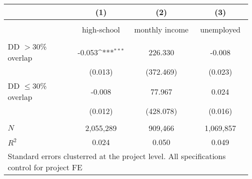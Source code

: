 {
\def\sym#1{\ifmmode^{#1}\else\(^{#1}\)\fi}
\begin{tabular}{l*{3}{c}}
 & (1) & (2) & (3)  \\[0.2em]
\hline\\[-0.9em]

                           &   high-school    &   monthly income     &   unemployed  \\
[0.2em]\hline \\[-0.9em]

DD $>$30\% overlap         &  -0.053\sym{***}  &  226.330         &   -0.008         \\
                           &  (0.013)          &(372.469)         &  (0.023)         \\
[0.5em]
DD $\leq$30\% overlap      &   -0.008         &   77.967         &    0.024         \\
                           &  (0.012)         &(428.078)         &  (0.016)         \\
\hline \\[-0.9em]    
\(N\)                      &  2,055,289         &   909,466         &  1,069,857    \\
\(R^{2}\)                  &    0.024         &    0.050         &    0.049         \\
\hline
\multicolumn{4}{l}{\tiny Standard errors clusterred at the project level. All specifications control for project FE}
\end{tabular}
}
